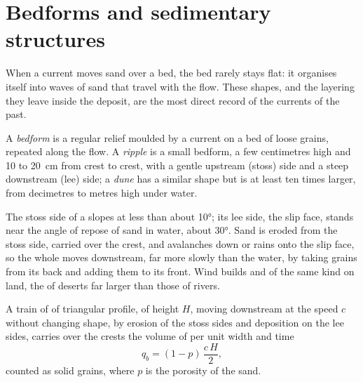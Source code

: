 \section{Bedforms and sedimentary structures}\label{sec:b1:clastic-sediments:bedforms}

When a current moves sand over a bed, the bed rarely stays flat: it organises
itself into waves of sand that travel with the flow. These shapes, and the
layering they leave inside the deposit, are the most direct record of the
currents of the past.

\begin{definition}\label{def:b1:clastic-sediments:bedform}
A \emph{bedform} is a regular relief moulded by a current on a
bed of loose grains, repeated along the flow. A \emph{ripple} is a
small bedform, a few centimetres high and 10 to \qty{20}{cm} from crest to
crest, with a gentle upstream (stoss) side and a steep downstream (lee) side; a
\emph{dune} has a similar shape but is at least ten times larger,
from decimetres to metres high under water.
\end{definition}

The stoss side of a  slopes at less than about \ang{10}; its lee side,
the slip face, stands near the angle of repose of sand in water, about
\ang{30}. Sand is eroded from the stoss side, carried over the crest, and
avalanches down or rains onto the slip face, so the whole  moves
downstream, far more slowly than the water, by taking grains from its back and
adding them to its front. Wind builds  and  of the same kind on
land, the  of deserts far larger than those of rivers.

\begin{proposition}\label{prop:b1:clastic-sediments:migration}
A train of  of triangular profile, of height $H$, moving downstream at
the speed $c$ without changing shape, by erosion of the stoss sides and
deposition on the lee sides, carries over the crests the volume of  per
unit width and time
\[
  q_b = (1 - p)\,\frac{c\,H}{2},
\]
counted as solid grains, where $p$ is the porosity of the sand.
\end{proposition}

